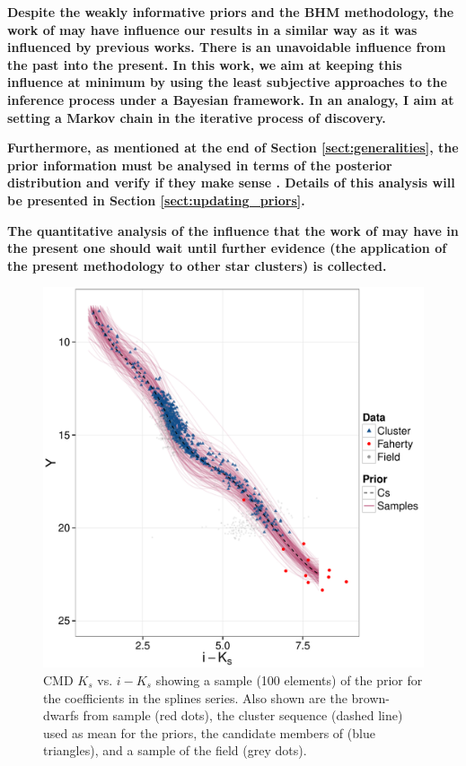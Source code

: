 \textbf{Despite the weakly informative priors and the BHM methodology, the work of \citet{Bouy2015} may have influence our results in a similar way as it was influenced by previous works. There is an unavoidable influence from the past into the present. In this work, we aim at keeping this influence at minimum by using the least subjective approaches to the inference process under a Bayesian framework. In an analogy, I aim at setting a Markov chain in the iterative process of discovery.}

\textbf{Furthermore, as mentioned at the end of Section \ref{sect:generalities}, the prior information must be analysed in terms of the posterior distribution and verify if they make sense \citep{Gelman2006,Gelman2013}. Details of this analysis will be presented in Section \ref{sect:updating_priors}.}

\textbf{The quantitative analysis of the influence that the work of \citet{Bouy2015} may have in the present one should wait until further evidence (the application of the present methodology to other star clusters) is collected.}
 


\begin{figure}[ht!]
\begin{center}
\includegraphics[page=4,width=\textwidth]{background/Figures/Priors_Coefs.pdf}
\caption{CMD $K_s$ vs. $i-K_s$ showing a sample (100 elements) of the prior for the coefficients in the splines series. Also shown are the brown-dwarfs from \citet{Faherty2012} sample (red dots), the cluster sequence (dashed line) used as mean for the priors, the candidate members of \citet{Bouy2015} (blue triangles), and a sample of the field (grey dots).}
\label{figure:priorcoefs}
\end{center}
\end{figure}



